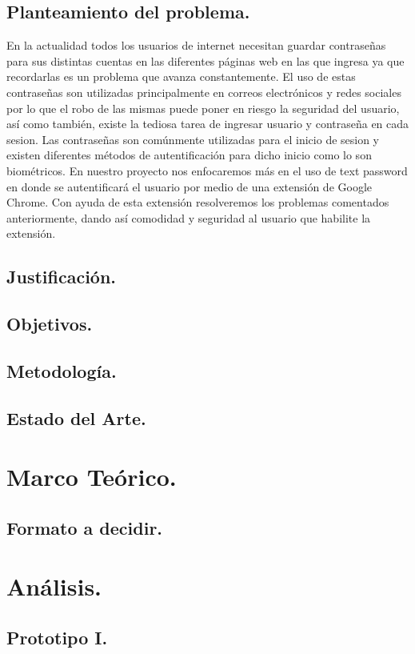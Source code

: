 \documentclass[12pt, a4paper, titlepage]{article}
\begin{document}
		\subsection{Planteamiento del problema.}
			En la actualidad todos los usuarios de internet necesitan guardar contraseñas para sus distintas cuentas en las diferentes páginas web en las que ingresa ya que recordarlas es un problema que avanza constantemente. El uso de estas contraseñas son utilizadas principalmente en correos electrónicos y redes sociales por lo que el robo de las mismas puede poner en riesgo la seguridad del usuario, así como también, existe la tediosa tarea de ingresar usuario y contraseña en cada sesion. Las contraseñas son comúnmente utilizadas para el inicio de sesion y existen diferentes métodos de autentificación para dicho inicio como lo son biométricos. En nuestro proyecto nos enfocaremos más en el uso de text password en donde se autentificará el usuario por medio de una extensión de Google Chrome. Con ayuda de esta extensión resolveremos los problemas comentados anteriormente, dando así comodidad y seguridad al usuario que habilite la extensión.    
		\subsection{Justificación.}
		
\subsection{Objetivos.}
		\subsection{Metodología.}
		\subsection{Estado del Arte.}
	\newpage
	\section{\textcolor{azulescom}{Marco Teórico.}}
		\subsection{Formato a decidir.}
	\newpage
	\section{\textcolor{azulescom}{Análisis.}}
		\subsection{Prototipo I.}
\end{document}
